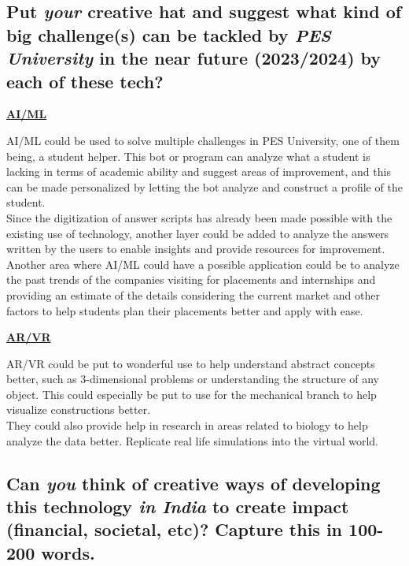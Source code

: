 \documentclass[a4paper]{article}
\begin{document}
\subsection{Put \textit{your} creative hat and suggest what kind of big challenge(s) can be tackled by \textit{PES University} in the near future (2023/2024) by each of these tech?}

\begin{center}
    \textbf{\underline{AI/ML}}
\end{center}

AI/ML could be used to solve multiple challenges in PES University, one of them being, a student helper. This bot or program can analyze what a student is lacking in terms of academic ability and suggest areas of improvement, and this can be made personalized by letting the bot analyze and construct a profile of the student.
\\Since the digitization of answer scripts has already been made possible with the existing use of technology, another layer could be added to analyze the answers written by the users to enable insights and provide resources for improvement.
\\Another area where AI/ML could have a possible application could be to analyze the past trends of the companies visiting for placements and internships and providing an estimate of the details considering the current market and other factors to help students plan their placements better and apply with ease.

\begin{center}
    \textbf{\underline{AR/VR}}
\end{center}

AR/VR could be put to wonderful use to help understand abstract concepts better, such as 3-dimensional problems or understanding the structure of any object. This could especially be put to use for the mechanical branch to help visualize constructions better.
\\They could also provide help in research in areas related to biology to help analyze the data better. Replicate real life simulations into the virtual world.

\subsection{Can \textit{you} think of creative ways of developing this technology \textit{in India} to create impact (financial, societal, etc)? Capture this in 100-200 words. }
\end{document}
